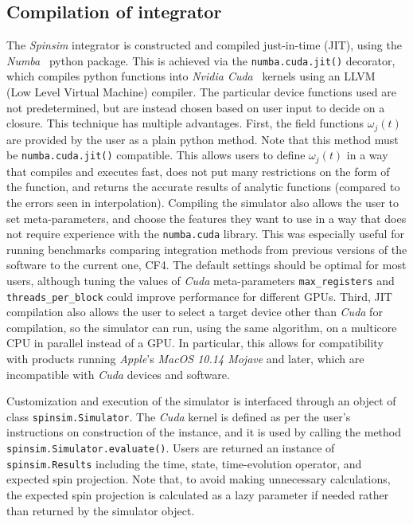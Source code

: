\documentclass{jors}
\begin{document}
	\subsection{Compilation of integrator}
		The \emph{Spinsim} integrator is constructed and compiled just-in-time (JIT), using the \emph{Numba}~\cite{lam_numba_2015} python package.
		This is achieved via the \texttt{numba.cuda.jit()} decorator, which compiles python functions into \emph{Nvidia Cuda}~\cite{nickolls_scalable_2008} kernels using an LLVM~\cite{lattner_llvm_2004} (Low Level Virtual Machine) compiler.
		The particular device functions used are not predetermined, but are instead chosen based on user input to decide on a closure.
		This technique has multiple advantages.
		First, the field functions $ \omega_j(t) $ are provided by the user as a plain python method.
		Note that this method must be \texttt{numba.cuda.jit()} compatible.
		This allows users to define $ \omega_j(t) $ in a way that compiles and executes fast, does not put many restrictions on the form of the function, and returns the accurate results of analytic functions (compared to the errors seen in interpolation).
		Compiling the simulator also allows the user to set meta-parameters, and choose the features they want to use in a way that does not require experience with the \texttt{numba.cuda} library.
		This was especially useful for running benchmarks comparing integration methods from previous versions of the software to the current one, CF4.
		The default settings should be optimal for most users, although tuning the values of \emph{Cuda} meta-parameters \texttt{max\_registers} and \texttt{threads\_per\_block} could improve performance for different GPUs.
		Third, JIT compilation also allows the user to select a target device other than \emph{Cuda} for compilation, so the simulator can run, using the same algorithm, on a multicore CPU in parallel instead of a GPU.
		In particular, this allows for compatibility with products running \emph{Apple}'s \emph{MacOS 10.14 Mojave} and later, which are incompatible with \emph{Cuda} devices and software.
		
		Customization and execution of the simulator is interfaced through an object of class \texttt{spinsim.Simulator}.
		The \emph{Cuda} kernel is defined as per the user’s instructions on construction of the instance, and it is used by calling the method \texttt{spinsim.Simulator.evaluate()}.
		Users are returned an instance of \texttt{spinsim.Results} including the time, state, time-evolution operator, and expected spin projection.
		Note that, to avoid making unnecessary calculations, the expected spin projection is calculated as a lazy parameter if needed rather than returned by the simulator object.
\end{document}
